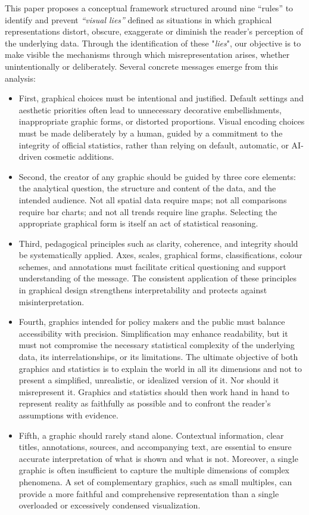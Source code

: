 \documentclass[11pt,twoside,a4paper]{article}
\begin{document}
This paper proposes a conceptual framework structured around nine “rules” to identify and prevent  \textit{``visual lies''} defined as situations in which graphical representations distort, obscure, exaggerate or diminish the reader's perception of the underlying data. Through the identification of these "\textit{lies}", our objective is to make visible the mechanisms through which misrepresentation arises, whether unintentionally or deliberately. Several concrete messages emerge from this analysis:
\begin{itemize}
    \item First, graphical choices must be intentional and justified. Default settings and aesthetic priorities often lead to unnecessary decorative embellishments, inappropriate graphic forms, or distorted proportions. Visual encoding choices must be made deliberately by a human, guided by a commitment to the integrity of official statistics, rather than relying on default, automatic, or AI-driven cosmetic additions.

    \item Second, the creator of any graphic should be guided by three core elements: the analytical question, the structure and content of the data, and the intended audience. Not all spatial data require maps; not all comparisons require bar charts; and not all trends require line graphs. Selecting the appropriate graphical form is itself an act of statistical reasoning.

    \item Third, pedagogical principles such as clarity, coherence, and integrity should be systematically applied. Axes, scales, graphical forms, classifications, colour schemes, and annotations must facilitate critical questioning and support understanding of the message. The consistent application of these principles in graphical design strengthens interpretability and protects against misinterpretation.

    \item Fourth, graphics intended for policy makers and the public must balance accessibility with precision. Simplification may enhance readability, but it must not compromise the necessary statistical complexity of the underlying data, its interrelationships, or its limitations. The ultimate objective of both graphics and statistics is to explain the world in all its dimensions and not to present a simplified, unrealistic, or idealized version of it. Nor should it misrepresent it. Graphics and statistics should then work hand in hand to represent reality as faithfully as possible and to confront the reader's assumptions with evidence.

    \item Fifth, a graphic should rarely stand alone. Contextual information, clear titles, annotations, sources, and accompanying text, are essential to ensure accurate interpretation of what is shown and what is not. Moreover, a single graphic is often insufficient to capture the multiple dimensions of complex phenomena. A set of complementary graphics, such as small multiples, can provide a more faithful and comprehensive representation than a single overloaded or excessively condensed visualization.
\end{itemize}
\end{document}
